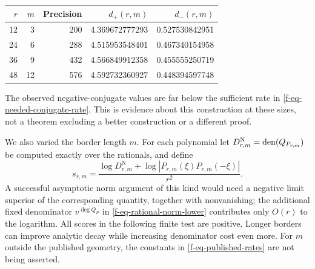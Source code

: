 \documentclass[11pt,a4paper]{article}
\theoremstyle{definition}
\theoremstyle{remark}
\begin{document}
\begin{center}
\begin{tabular}{r r r r r}
\hline
$r$&$m$&Precision&$d_+(r,m)$&$d_-(r,m)$\\
\hline
12&3&200&4.369672777293&0.527530842951\\
24&6&288&4.515953548401&0.467340154958\\
36&9&432&4.566849912358&0.455555250719\\
48&12&576&4.592732360927&0.448394597748\\
\hline
\end{tabular}
\end{center}
The observed negative-conjugate values are far below the sufficient rate
in \eqref{f-eq-needed-conjugate-rate}.  This is evidence about this
construction at these sizes, not a theorem excluding a better construction
or a different proof.

We also varied the border length $m$.  For each polynomial let
$D_{r,m}^{\mathrm N}=\operatorname{den}(Q_{P_{r,m}})$ be computed exactly over the
rationals, and define
\begin{equation}
 s_{r,m}=\frac{\log D_{r,m}^{\mathrm N}
 +\log|P_{r,m}(\xi)P_{r,m}(-\xi)|}{r^2}.
 \label{f-eq-border-score}
\end{equation}
A successful asymptotic norm argument of this kind would need a negative
limit superior of the corresponding quantity, together with nonvanishing;
the additional fixed denominator $v^{\deg Q_P}$ in
\eqref{f-eq-rational-norm-lower} contributes only $O(r)$ to the logarithm.
All scores in the following finite test are positive.  Longer borders can
improve analytic decay while increasing denominator cost even more.
For $m$ outside the published geometry, the constants in
\eqref{f-eq-published-rates} are not being asserted.
\end{document}
